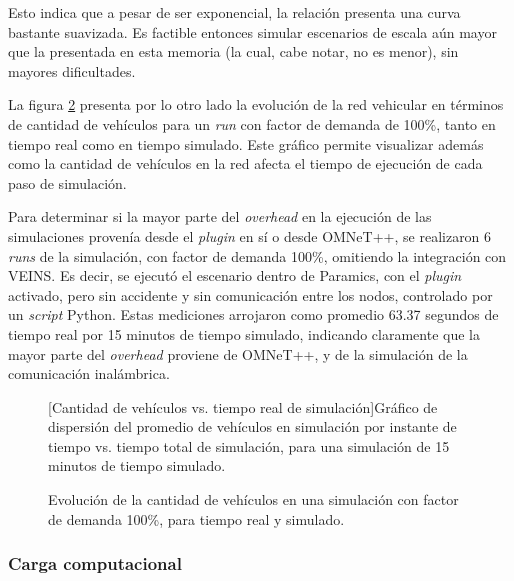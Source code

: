 Esto indica que a pesar de ser exponencial, la relación presenta una curva bastante suavizada. Es factible entonces simular escenarios de escala aún mayor que la presentada en esta memoria (la cual, cabe notar, no es menor), sin mayores dificultades.

La figura \ref{fig:timevsvehicles_evolution} presenta por lo otro lado la evolución de la red vehicular en términos de cantidad de vehículos para un \emph{run} con factor de demanda de 100\%, tanto en tiempo real como en tiempo simulado. Este gráfico permite visualizar además como la cantidad de vehículos en la red afecta el tiempo de ejecución de cada paso de simulación.

Para determinar si la mayor parte del \emph{overhead} en la ejecución de las simulaciones provenía desde el \emph{plugin} en sí o desde OMNeT++, se realizaron 6 \emph{runs} de la simulación, con factor de demanda 100\%, omitiendo la integración con VEINS. Es decir, se ejecutó el escenario dentro de Paramics, con el \emph{plugin} activado, pero sin accidente y sin comunicación entre los nodos, controlado por un \emph{script} Python. Estas mediciones arrojaron como promedio 63.37 segundos de tiempo real por 15 minutos de tiempo simulado, indicando claramente que la mayor parte del \emph{overhead} proviene de OMNeT++, y de la simulación de la comunicación inalámbrica.

\begin{figure}[tpb]
    \centering    
    
    [Cantidad de vehículos vs. tiempo real de simulación]{Gráfico de dispersión del promedio de vehículos en simulación por instante de tiempo vs. tiempo total de simulación, para una simulación de 15 minutos de tiempo simulado.}
    \label{fig:vehiclesvstime}
\end{figure}

\begin{figure}[tpb]
    \centering
    
    \caption[Evolución temporal de la cantidad de vehículos en la simulación.]{Evolución de la cantidad de vehículos en una simulación con factor de demanda 100\%, para tiempo real y simulado.}
    \label{fig:timevsvehicles_evolution}
\end{figure}

\subsubsection{Carga computacional}

